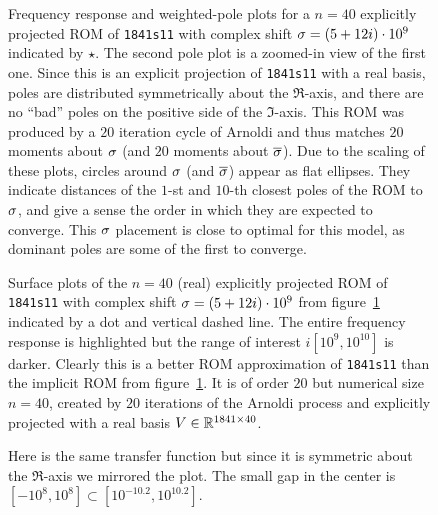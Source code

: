 \begin{figure}
\centering
{}
\vfill
{}
\vfill
{}
\caption{\label{fig:1841s11_exp_20_1}Frequency response and weighted-pole plots for a $n=40$ explicitly projected ROM of \texttt{1841s11} with complex shift $\sigma=(5+12i)\cdot10^{9}$ indicated by $\star$.  The second pole plot is a zoomed-in view of the first one.  Since this is an explicit projection of \texttt{1841s11} with a real basis,  poles are distributed symmetrically about the $\Re$-axis, and there are no ``bad'' poles on the positive side of the $\Im$-axis.  This ROM was produced by a $20$ iteration cycle of Arnoldi and thus matches $20$ moments about $\sigma$ (and $20$ moments about $\overline{\sigma}$).  Due to the scaling of these plots, circles around $\sigma$ (and $\overline{\sigma}$)  appear as flat ellipses.  They indicate distances of the $1$-st and $10$-th closest poles of the ROM to $\sigma$, and give a sense the order in which they are expected to converge. This $\sigma$ placement is close to optimal for this model, as dominant poles are some of the first to converge. }
\end{figure}


\begin{figure}
\centering
{}
\caption{Surface plots of the $n=40$ (real) explicitly projected ROM of \texttt{1841s11} with complex shift $\sigma=(5+12i)\cdot10^{9}$ from figure~\ref{fig:1841s11_exp_20_1} indicated by a dot and vertical dashed line.  The entire frequency response is highlighted but the range of interest $i[10^9,10^{10}]$ is darker.  Clearly this is a better ROM approximation of \texttt{1841s11} than the implicit ROM from figure~\ref{fig:1841s11_exp_20_1}.  It is of order $20$ but numerical size $n=40$, created by $20$ iterations of the Arnoldi process and explicitly projected with a real basis $V\in\mathbb{R}^{1841\times 40}$.}
\vfill
{}
\caption{Here is the same transfer function but since it is symmetric about the $\Re$-axis we mirrored the plot.  The small gap in the center is $[-10^{8}, 10^8]\subset[10^{-10.2}, 10^{10.2} ]$.}
\vfill
\end{figure}


